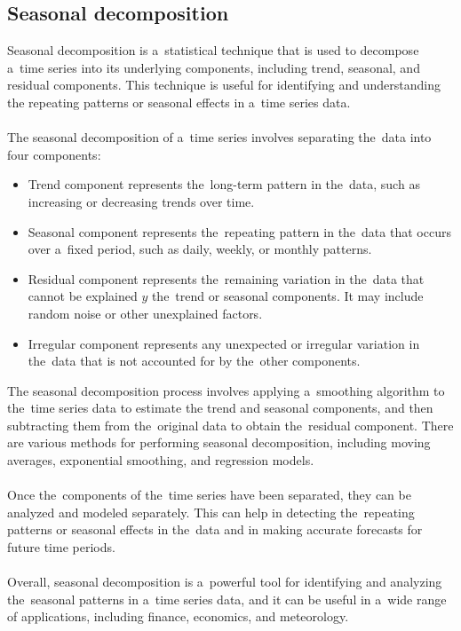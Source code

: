 \subsection{Seasonal decomposition}\label{subsec:seasonal}
Seasonal decomposition is a~statistical technique that is used to decompose a~time series into its underlying components,
including trend, seasonal, and residual components. This technique is useful for identifying and understanding
the repeating patterns or seasonal effects in a~time series data.\\
\\
The seasonal decomposition of a~time series involves separating the~data into four components:
\begin{itemize}
    \item Trend component represents the~long-term pattern in the~data, such as increasing or
    decreasing trends over time.
    \item Seasonal component represents the~repeating pattern in the~data that occurs over a~fixed
    period, such as daily, weekly, or monthly patterns.
    \item Residual component represents the~remaining variation in the~data that cannot be explained
    $y$ the~trend or seasonal components. It may include random noise or other unexplained factors.
    \item Irregular component represents any unexpected or irregular variation in the~data that is not
    accounted for by the~other components.
\end{itemize}
The seasonal decomposition process involves applying a~smoothing algorithm to the~time series data to estimate the
trend and seasonal components, and then subtracting them from the~original data to obtain the~residual component.
There are various methods for performing seasonal decomposition, including moving averages, exponential smoothing,
and regression models.\\
\\
Once the~components of the~time series have been separated, they can be analyzed and modeled separately.
This can help in detecting the~repeating patterns or seasonal effects in the~data and in making accurate forecasts for
future time periods.\\
\\
Overall, seasonal decomposition is a~powerful tool for identifying and analyzing the~seasonal patterns in a~time series
data, and it can be useful in a~wide range of applications, including finance, economics, and meteorology.\\

